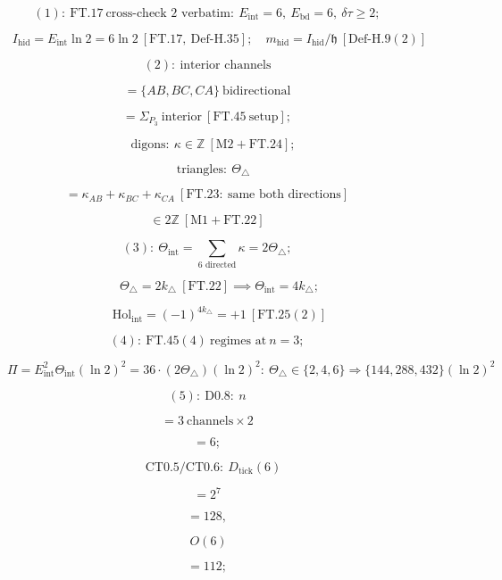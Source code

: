 \begin{theorem}
\[
(1):\ \mathrm{FT.17}\ \text{cross-check 2 verbatim}:\ E_{\mathrm{int}}=6,\ E_{\mathrm{bd}}=6,\ \delta\tau\ge2;
\]

\[
\qquad I_{\mathrm{hid}}=E_{\mathrm{int}}\ln2=6\ln2\ [\mathrm{FT.17},\ \text{Def-H.35}];\quad m_{\mathrm{hid}}=I_{\mathrm{hid}}/\mathfrak h\ [\mathrm{Def\text{-}H.9}(2)]
\]

\[
(2):\ \text{interior channels}
\]

\[
= \{AB,BC,CA\}\ \text{bidirectional}
\]

\[
= \Sigma_{P_3}\ \text{interior}\ [\mathrm{FT.45}\ \text{setup}];
\]

\[
\quad\text{digons}:\ \kappa\in\mathbb Z\ [\mathrm{M2}+\mathrm{FT.24}];
\]

\[
\quad\text{triangles}:\ \Theta_{\triangle}
\]

\[
= \kappa_{AB}{+}\kappa_{BC}{+}\kappa_{CA}\ [\mathrm{FT.23}:\ \text{same both directions}]
\]

\[
\in 2\mathbb Z\ [\mathrm{M1}+\mathrm{FT.22}]
\]

\[
(3):\ \Theta_{\mathrm{int}}=\!\!\sum_{\text{6 directed}}\!\!\kappa=2\Theta_{\triangle};
\]

\[
\qquad \Theta_{\triangle}=2k_{\triangle}\ [\mathrm{FT.22}]\implies\Theta_{\mathrm{int}}=4k_{\triangle};
\]

\[
\qquad \mathrm{Hol}_{\mathrm{int}}=(-1)^{4k_{\triangle}}=+1\ [\mathrm{FT.25}(2)]
\]

\[
(4):\ \mathrm{FT.45}(4)\ \text{regimes at}\ n{=}3;
\]

\[
\qquad \Pi=E_{\mathrm{int}}^2\Theta_{\mathrm{int}}(\ln2)^2=36\cdot(2\Theta_{\triangle})(\ln2)^2:\ \Theta_{\triangle}\in\{2,4,6\}\Rightarrow\{144,288,432\}(\ln2)^2
\]

\[
(5):\ \mathrm{D0.8}:\ n
\]

\[
= 3\ \text{channels}\times2
\]

\[
= 6;
\]

\[
\quad\mathrm{CT0.5}/\mathrm{CT0.6}:\ D_{\mathrm{tick}}(6)
\]

\[
= 2^7
\]

\[
= 128,
\]

\[
\ O(6)
\]

\[
= 112;
\]


\end{theorem}
